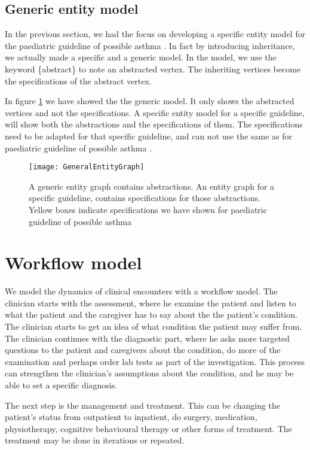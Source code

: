 \subsection{Generic entity model}
In the previous section, we had the focus on developing a specific entity model for the paediatric guideline of possible asthma \parencite{RepublicofKeny2016}. In fact by introducing inheritance, we actually made a specific and a generic model. In the model, we use the keyword \{abstract\} to note an abstracted vertex. The inheriting vertices become the specifications of the abstract vertex. 

In figure \ref{fig:GeneralEntityGraph} we have showed the the generic model. It only shows the abstracted vertices and not the specifications. A specific entity model for a specific guideline, will show both the abstractions and the specifications of them. The specifications need to be adapted for that specific guideline, and can not use the same as for paediatric guideline of possible asthma \parencite{RepublicofKeny2016}.

\begin{figure}[h!]
	\texttt{[image: GeneralEntityGraph]}
	\caption {A generic entity graph contains abstractions. An entity graph for a specific guideline, contains specifications for those abstractions. Yellow boxes indicate specifications we have shown for paediatric guideline of possible asthma \parencite{RepublicofKeny2016}}
	\label{fig:GeneralEntityGraph}
\end{figure}

\section{Workflow model}
We model the dynamics of clinical encounters with a workflow model. The clinician starts with the assessment, where he examine the patient and listen to what the patient and the caregiver has to say about the the patient's condition. The clinician starts to get an idea of what condition the patient may suffer from. The clinician continues with the diagnostic part, where he asks more targeted questions to the patient and caregivers about the condition, do more of the examination and perhaps order lab tests as part of the investigation. This process can strengthen the clinician's assumptions about the condition, and he may be able to set a specific diagnosis.

The next step is the management and treatment. This can be changing the patient's status from outpatient to inpatient, do surgery, medication, physiotherapy, cognitive behavioural therapy or other forms of treatment. The treatment may be done in iterations or repeated.


